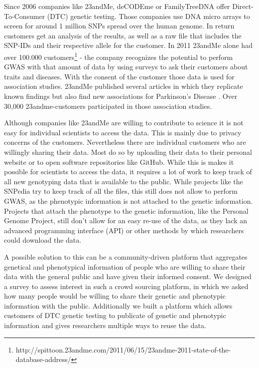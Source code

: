 \documentclass[10pt]{article}
\begin{document}
Since 2006 companies like 23andMe, deCODEme or FamilyTreeDNA offer Direct-To-Consumer (DTC) genetic testing. Those companies use DNA micro arrays to screen for around 1 million SNPs spread over the human genome. In return customers get an analysis of the results, as well as a raw file that includes the SNP-IDs and their respective allele for the customer. In 2011 23andMe alone had over 100.000 customers\footnote{http://spittoon.23andme.com/2011/06/15/23andme-2011-state-of-the-database-address/} - the company recognizes the potential to perform GWAS with that amount of data by using surveys to ask their customers about traits and diseases. With the consent of the customer those data is used for association studies. 23andMe published several articles in which they replicate known findings but also find new associations for Parkinson's Disease \cite{Eriksson2010, Do2011}. Over 30,000 23andme-customers participated in those association studies.  

Although companies like 23andMe are willing to contribute to science it is not easy for individual scientists to access the data. This is mainly due to privacy concerns of the customers. Nevertheless there are individual customers who are willingly sharing their data. Most do so by uploading their data to their personal website or to open software repositories like GitHub. While this is makes it possible for scientists to access the data, it requires a lot of work to keep track of all new genotyping data that is available to the public. While projects like the SNPedia try to keep track of all the files, this still does not allow to perform GWAS, as the phenotypic information is not attached to the genetic information. Projects that attach the phenotype to the genetic information, like the Personal Genome Project, still don't allow for an easy re-use of the data, as they lack an advanced programming interface (API) or other methods by which researchers could download the data.  

A possible solution to this can be a community-driven platform that aggregates genetical and phenotypical information of people who are willing to share their data with the general public and have given their informed consent. We designed a survey to assess interest in such a crowd sourcing platform, in which we asked how many people would be willing to share their genetic and phenotypic information with the public. Additionally we built a platform which allows customers of DTC genetic testing to publicate of genetic and phenotypic information and gives researchers multiple ways to reuse the data. 
\end{document}
